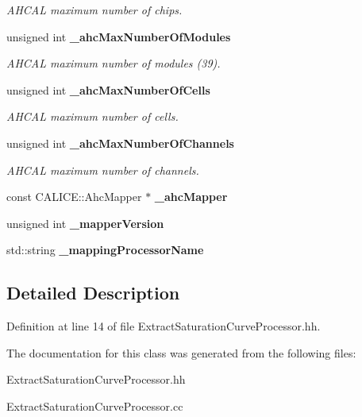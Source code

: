 \begin{DoxyCompactItemize}
\begin{DoxyCompactList}\small\item\em AHCAL maximum number of chips. \item\end{DoxyCompactList}\item 
unsigned int {\bf \_\-ahcMaxNumberOfModules}\label{classExtractSaturationCurveProcessor_a27dadca929860032628e9e5984c4635b}

\begin{DoxyCompactList}\small\item\em AHCAL maximum number of modules (39). \item\end{DoxyCompactList}\item 
unsigned int {\bf \_\-ahcMaxNumberOfCells}\label{classExtractSaturationCurveProcessor_a78254103bebe4692ff7113e20be44381}

\begin{DoxyCompactList}\small\item\em AHCAL maximum number of cells. \item\end{DoxyCompactList}\item 
unsigned int {\bf \_\-ahcMaxNumberOfChannels}\label{classExtractSaturationCurveProcessor_ab4e53af430d5dd5ccf667a4d3f3c2176}

\begin{DoxyCompactList}\small\item\em AHCAL maximum number of channels. \item\end{DoxyCompactList}\item 
const CALICE::AhcMapper $\ast$ {\bfseries \_\-ahcMapper}\label{classExtractSaturationCurveProcessor_aad14e61b12d09a38bdbb0128ea8dc2c8}

\item 
unsigned int {\bfseries \_\-mapperVersion}\label{classExtractSaturationCurveProcessor_ae74dd1f33b1ff0ae67e32384bd33d0bf}

\item 
std::string {\bfseries \_\-mappingProcessorName}\label{classExtractSaturationCurveProcessor_a46e5e0f8be8ef1842cd478b8be63558c}

\end{DoxyCompactItemize}


\subsection{Detailed Description}


Definition at line 14 of file ExtractSaturationCurveProcessor.hh.

The documentation for this class was generated from the following files:\begin{DoxyCompactItemize}
\item 
ExtractSaturationCurveProcessor.hh\item 
ExtractSaturationCurveProcessor.cc\end{DoxyCompactItemize}
